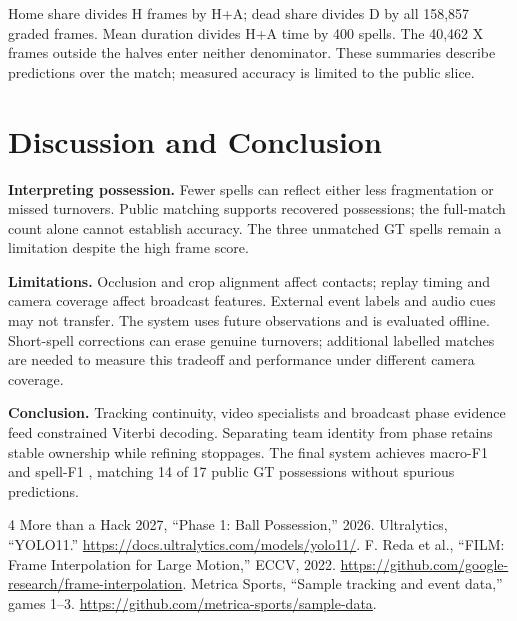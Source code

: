 \documentclass[conference,a4paper,10pt]{IEEEtran}
\begin{document}
Home share divides H frames by H+A; dead share divides D by all 158,857 graded
frames. Mean duration divides H+A time by 400 spells. The 40,462 X frames
outside the halves enter neither denominator. These summaries describe
predictions over the match; measured accuracy is limited to the public slice.

\section{Discussion and Conclusion}
\textbf{Interpreting possession.} Fewer spells can reflect either less
fragmentation or missed turnovers. Public matching supports recovered
possessions; the full-match count alone cannot establish accuracy. The three
unmatched GT spells remain a limitation despite the high frame score.

\textbf{Limitations.} Occlusion and crop alignment affect contacts; replay timing
and camera coverage affect broadcast features. External event labels and audio
cues may not transfer. The system uses future observations and is evaluated
offline. Short-spell corrections can erase genuine turnovers; additional
labelled matches are needed to measure this tradeoff and performance under
different camera coverage.

\textbf{Conclusion.} Tracking continuity, video specialists and broadcast phase
evidence feed constrained Viterbi decoding. Separating team identity from phase
retains stable ownership while refining stoppages. The final system achieves
macro-F1 \MacroScore{} and spell-F1 \SpellScore{}, matching 14 of 17 public GT
possessions without spurious predictions.

\begin{thebibliography}{4}
 More than a Hack 2027, ``Phase 1: Ball Possession,'' 2026.
 Ultralytics, ``YOLO11.'' \url{https://docs.ultralytics.com/models/yolo11/}.
 F. Reda et al., ``FILM: Frame Interpolation for Large Motion,'' ECCV, 2022.
\url{https://github.com/google-research/frame-interpolation}.
 Metrica Sports, ``Sample tracking and event data,'' games 1--3.
\url{https://github.com/metrica-sports/sample-data}.
\end{thebibliography}
\end{document}
